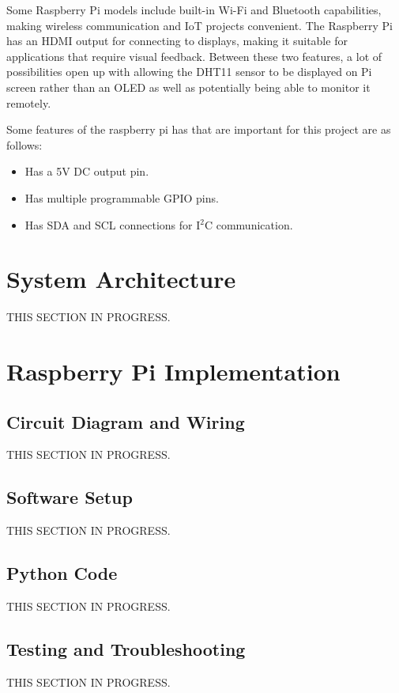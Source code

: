 \documentclass{article}
\begin{document}
\begin{multicols}{2}
			Some Raspberry Pi models include built-in Wi-Fi and Bluetooth capabilities, making wireless communication and IoT projects convenient. The Raspberry Pi has an HDMI output for connecting to displays, making it suitable for applications that require visual feedback. Between these two features, a lot of possibilities open up with allowing the DHT11 sensor to be displayed on Pi screen rather than an OLED as well as potentially being able to monitor it remotely.
			
			Some features of the raspberry pi has that are important for this project are as follows:
			\begin{itemize}[itemsep=1pt, parsep=1pt]
				\item Has a 5V DC output pin.
				\item Has multiple programmable GPIO pins.
				\item Has SDA and SCL connections for I$^2$C communication.
			\end{itemize}
		
		\section{System Architecture}
		THIS SECTION IN PROGRESS.
		
		\section{Raspberry Pi Implementation}
		
			\subsection{Circuit Diagram and Wiring}
			THIS SECTION IN PROGRESS.
			
			\subsection{Software Setup}
			THIS SECTION IN PROGRESS.
			
			\subsection{Python Code}
			THIS SECTION IN PROGRESS.
			
			\subsection{Testing and Troubleshooting}
			THIS SECTION IN PROGRESS.
		

\end{multicols}
\end{document}
